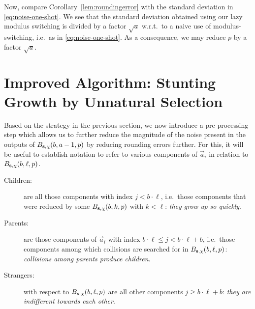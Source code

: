 
Now, compare Corollary~\ref{lem:roundingerror} with the standard deviation in \eqref{eq:noise-one-shot}. We see that the standard deviation obtained using our lazy modulus 
switching is divided by a factor $\sqrt{a}$ w.r.t.\ to a naive use of modulus-switching, i.e.\ as in \eqref{eq:noise-one-shot}. As a consequence,  we may reduce $p$ by a factor $\sqrt{a}$.
\section{Improved Algorithm: Stunting Growth by Unnatural Selection} \label{sec:control-growth}

Based on the strategy in the previous section, we now introduce a pre-processing step which allows us to further reduce the magnitude of the noise present in the outputs of $B_{\mathbf{s},\chi}(b,a-1,p)$ by reducing rounding errors further. For this, it will be useful to establish notation to refer to various components of $\vec{a}_i$ in relation to $B_{\mathbf{s},\chi}(b,\ell,p)$.
\begin{description}
 \item[Children:] are all those components with index $j < b \cdot \ell$, i.e.\ those components that were reduced by some $B_{\mathbf{s},\chi}(b,k,p)$ with $k<\ell$: \emph{they grow up so quickly}.
 \item[Parents:] are those components of $\vec{a}_i$ with index $b\cdot \ell \leq j < b\cdot \ell + b$, i.e.\ those components among which collisions are searched for in $B_{\mathbf{s},\chi}(b,\ell,p)$: \emph{collisions among parents produce children}.
 \item[Strangers:] with respect to $B_{\mathbf{s},\chi}(b,\ell,p)$ are all other components $j\geq b\cdot \ell + b$: \emph{they are indifferent towards each other}.
\end{description}

